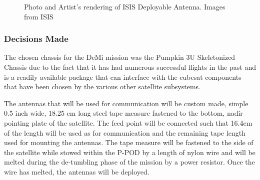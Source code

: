 \documentclass[12pt]{article}
\begin{document}
\begin{figure}[!ht]
\hfill
{}
\hfill
{}
\hfill
\caption{Photo and Artist’s rendering of ISIS Deployable Antenna. Images from ISIS~\cite{isis-image}}
\label{fig:str-2-3}
\end{figure}

\subsubsection{Decisions Made}
The chosen chassis for the DeMi mission was the Pumpkin 3U Skeletonized Chassis due to the fact that it has had numerous successful flights in the past and is a readily available package that can interface with the cubesat components that have been chosen by the various other satellite subsystems.

The antennas that will be used for communication will be custom made, simple 0.5 inch wide, 18.25 cm long steel tape measure fastened to the bottom, nadir pointing plate of the satellite. The feed point will be connected such that 16.4cm of the length will be used as for communication and the remaining tape length used for mounting the antennas. The tape measure will be fastened to the side of the satellite while stowed within the P-POD by a length of nylon wire and will be melted during the de-tumbling phase of the mission by a power resistor. Once the wire has melted, the antennas will be deployed.
\end{document}
